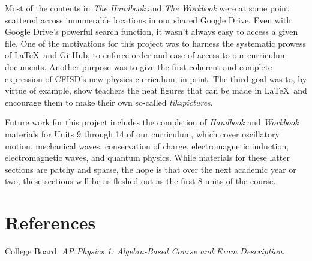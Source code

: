 \documentclass[12pt]{article}
\begin{document}
Most of the contents in \textit{The Handbook} and \textit{The Workbook} were at some point scattered across innumerable locations in our shared Google Drive. Even with Google Drive's powerful search function, it wasn't always easy to access a given file. One of the motivations for this project was to harness the systematic prowess of \LaTeX\ and GitHub, to enforce order and ease of access to our curriculum documents. Another purpose was to give the first coherent and complete expression of CFISD's new physics curriculum, in print. The third goal was to, by virtue of example, show teachers the neat figures that can be made in \LaTeX\ and encourage them to make their own so-called \textit{tikzpictures}.

Future work for this project includes the completion of \textit{Handbook} and \textit{Workbook} materials for Units 9 through 14 of our curriculum, which cover oscillatory motion, mechanical waves, conservation of charge, electromagnetic induction, electromagnetic waves, and quantum physics. While materials for these latter sections are patchy and sparse, the hope is that over the next academic year or two, these sections will be as fleshed out as the first 8 units of the course.





\clearpage




\section{References}

\noindent College Board. \textit{AP Physics 1: Algebra-Based Course and Exam Description}. 
\end{document}
